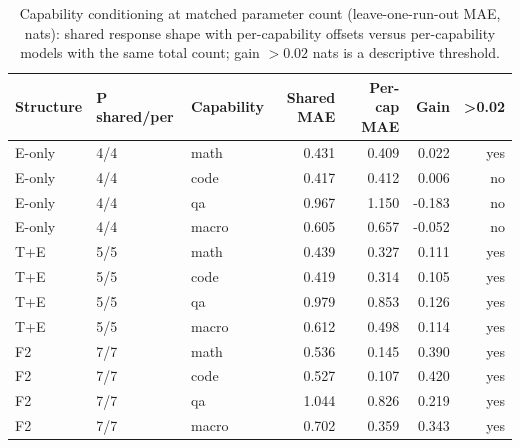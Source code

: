 \begin{table}[t]\centering\scriptsize\setlength{\tabcolsep}{2pt}
\begin{tabular}{@{}lllrrrr@{}}
\toprule
Structure & P shared/per & Capability & Shared MAE & Per-cap MAE & Gain & >0.02 \\
\midrule
E-only & 4/4 & math & 0.431 & 0.409 & 0.022 & yes \\
E-only & 4/4 & code & 0.417 & 0.412 & 0.006 & no \\
E-only & 4/4 & qa & 0.967 & 1.150 & -0.183 & no \\
E-only & 4/4 & macro & 0.605 & 0.657 & -0.052 & no \\
T+E & 5/5 & math & 0.439 & 0.327 & 0.111 & yes \\
T+E & 5/5 & code & 0.419 & 0.314 & 0.105 & yes \\
T+E & 5/5 & qa & 0.979 & 0.853 & 0.126 & yes \\
T+E & 5/5 & macro & 0.612 & 0.498 & 0.114 & yes \\
F2 & 7/7 & math & 0.536 & 0.145 & 0.390 & yes \\
F2 & 7/7 & code & 0.527 & 0.107 & 0.420 & yes \\
F2 & 7/7 & qa & 1.044 & 0.826 & 0.219 & yes \\
F2 & 7/7 & macro & 0.702 & 0.359 & 0.343 & yes \\
\bottomrule\end{tabular}
\caption{Capability conditioning at matched parameter count (leave-one-run-out MAE, nats): shared response shape with per-capability offsets versus per-capability models with the same total count; gain $>0.02$ nats is a descriptive threshold.}
\label{tab:v56_condition}\end{table}
